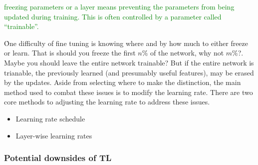 \textcolor{green}{{freezing} parameters or a layer means preventing the parameters from being updated during training. This is often controlled by a parameter called ``trainable''.}



\r{One difficulty of fine tuning is knowing where and by how much to either freeze or learn. That is should you freeze the first $n\%$ of the network, why not $m\%$?. Maybe you should leave the entire network trainable? But if the entire network is trianable, the previously learned (and presumably useful features), may be erased by the updates. Aside from selecting where to make the distinction, the main method used to combat these issues is to modify the learning rate. There are two core methods to adjusting the learning rate to address these issues.}

\begin{itemize}[noitemsep,topsep=0pt]
	\item Learning rate schedule
	\item Layer-wise learning rates
\end{itemize}





\subsubsection{Potential downsides of TL}



